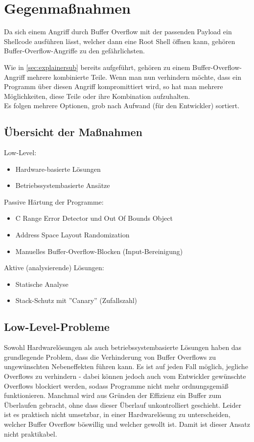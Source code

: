 \pagebreak
\section{Gegenmaßnahmen}
Da sich einem Angriff durch Buffer Overflow mit der passenden Payload
ein Shellcode ausführen lässt, welcher dann eine Root Shell
öffnen kann, gehören
Buffer-Overflow-Angriffe zu den gefährlichsten.

Wie in \autoref{sec:explainersub} bereits aufgeführt,
gehören zu einem Buffer-Overflow-Angriff mehrere kombinierte Teile. Wenn
man nun verhindern möchte, dass ein Programm über diesen Angriff kompromittiert wird, 
so hat man mehrere Möglichkeiten, diese Teile oder ihre Kombination aufzuhalten. \cite{Werthmann2006SurveyOB}\\

Es folgen mehrere Optionen, grob nach Aufwand (für den Entwickler) sortiert.
\subsection{Übersicht der Maßnahmen}
Low-Level:
\begin{itemize}
    \item Hardware-basierte Lösungen
    \item Betriebssystembasierte Ansätze
\end{itemize}
Passive Härtung der Programme:
\begin{itemize}
    \item C Range Error Detector und Out Of Bounds Object
    \item Address Space Layout Randomization
    \item Manuelles Buffer-Overflow-Blocken (Input-Bereinigung)
\end{itemize}
Aktive (analysierende) Lösungen:
\begin{itemize}
    \item Statische Analyse
    \item Stack-Schutz mit ''Canary'' (Zufallszahl)
\end{itemize}

\subsection{Low-Level-Probleme}
Sowohl Hardwarelösungen als auch betriebssystembasierte Lösungen haben
das grundlegende Problem, dass die Verhinderung von Buffer Overflows zu
ungewünschten Nebeneffekten führen kann. Es ist auf jeden Fall möglich,
jegliche Overflows zu verhindern - dabei können jedoch auch vom
Entwickler gewünschte Overflows blockiert werden, sodass Programme nicht mehr
ordnungsgemäß funktionieren. Manchmal wird aus Gründen der Effizienz ein
Buffer zum Überlaufen gebracht, ohne dass dieser Überlauf unkontrolliert
geschieht. Leider ist es praktisch nicht umsetzbar, in einer Hardwarelösung
zu unterscheiden, welcher Buffer Overflow böswillig und welcher gewollt ist. 
Damit ist dieser Ansatz nicht praktikabel.
\pagebreak

